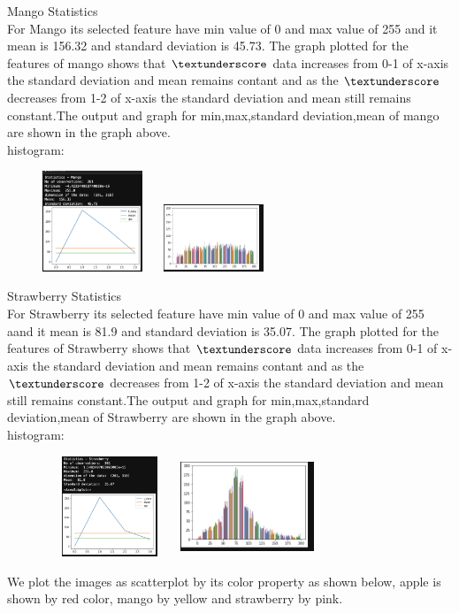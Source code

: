 \documentclass[conference]{IEEEtran}
\begin{document}
Mango Statistics \\
For Mango its selected feature have min value of 0 and max value of 255 and it mean is 156.32 and standard deviation is 45.73. The graph plotted for the features of mango shows that $\textunderscore$ data increases from 0-1 of x-axis the standard deviation and mean remains contant and as the $\textunderscore$ decreases from 1-2 of x-axis the standard deviation and mean still remains constant.The output and graph for min,max,standard deviation,mean of mango are shown in the graph above. \\
histogram: \\
\begin{figure}[!htbp]
    \centering
    \includegraphics[height=3cm]{Task7_Mango.png} 
    \includegraphics[height=2cm,width=4cm]{Task2.36.png} 
    \label{fig:my_label}
\end{figure}

Strawberry Statistics \\
For Strawberry its selected feature have min value of 0 and max value of 255 aand it mean is 81.9 and standard deviation is 35.07. The graph plotted for the features of Strawberry shows that $\textunderscore$ data increases from 0-1 of x-axis the standard deviation and mean remains contant and as the $\textunderscore$ decreases from 1-2 of x-axis the standard deviation and mean still remains constant.The output and graph for min,max,standard deviation,mean of Strawberry are shown in the graph above.\\
histogram: \\
\begin{figure}[!htbp]
    \centering
    \includegraphics[height=3cm,width=4cm]{Task7_Strawberry.png} 
    \includegraphics[height=3cm,width=4cm]{Task2.37.png} 
    \label{fig:my_label}
\end{figure}
We plot the images as scatterplot by its color property as shown below, apple is shown by red color, mango by yellow and strawberry by pink. \\
\end{document}
